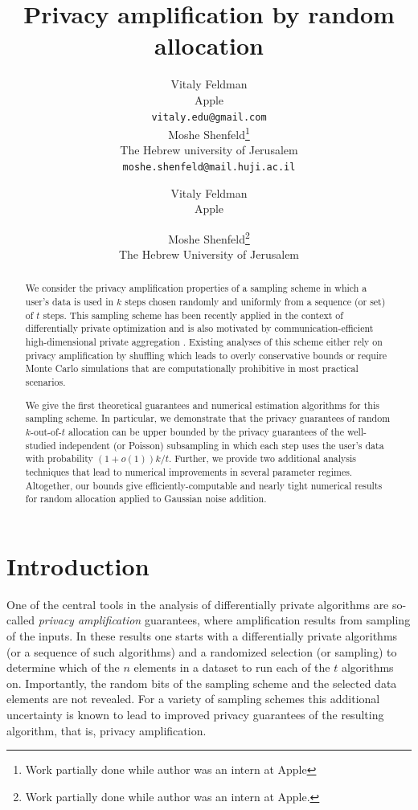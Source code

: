 \documentclass{article}
\title{Privacy amplification by random allocation}
\author{
    Vitaly Feldman \\
    Apple\\
    \texttt{vitaly.edu@gmail.com} \\
    \And
    Moshe Shenfeld\thanks{Work partially done while author was an intern at Apple} \\
    The Hebrew university of Jerusalem \\
    \texttt{moshe.shenfeld@mail.huji.ac.il} \\
}
\author{
    Vitaly Feldman\\
    Apple \\
    \and
    Moshe Shenfeld\footnote{Work partially done while author was an intern at Apple.}\\
    The Hebrew University of Jerusalem
}
\theoremstyle{plain}
\theoremstyle{definition}
\begin{document}
\maketitle

\begin{abstract}
    We consider the privacy amplification properties of a sampling scheme in which a user's data is used in $k$ steps chosen randomly and uniformly from a sequence (or set) of $t$ steps. This sampling scheme has been recently applied in the context of differentially private optimization \citep{CGHLKKMSZ24, CCGHST25} and is also motivated by communication-efficient high-dimensional private aggregation \citep{AFKRT25}. Existing analyses of this scheme either rely on privacy amplification by shuffling which leads to overly conservative bounds or require Monte Carlo simulations that are computationally prohibitive in most practical scenarios.
    
    We give the first theoretical guarantees and numerical estimation algorithms for this sampling scheme. In particular, we demonstrate that the privacy guarantees of random $k$-out-of-$t$ allocation can be upper bounded by the privacy guarantees of the well-studied independent (or Poisson) subsampling in which each step uses the user's data with probability $(1+o(1))k/t$. Further, we provide two additional analysis techniques that lead to numerical improvements in several parameter regimes. Altogether, our bounds give efficiently-computable and nearly tight numerical results for random allocation applied to Gaussian noise addition.
\end{abstract}


\section{Introduction}
One of the central tools in the analysis of differentially private algorithms are so-called {\em privacy amplification} guarantees, where amplification results from sampling of the inputs. In these results one starts with a differentially private algorithms (or a sequence of such algorithms) and a randomized selection (or sampling) to determine which of the $n$ elements in a dataset to run each of the $t$ algorithms on. Importantly, the random bits of the sampling scheme and the selected data elements are not revealed. For a variety of sampling schemes this additional uncertainty is known to lead to improved privacy guarantees of the resulting algorithm, that is, privacy amplification. 
\end{document}
